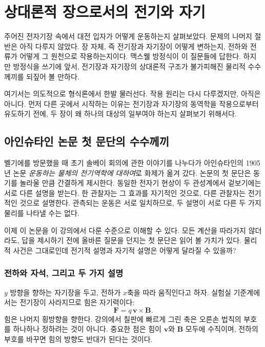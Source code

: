 \chapter{상대론적 장으로서의 전기와 자기}

주어진 전자기장 속에서 대전 입자가 어떻게 운동하는지 살펴보았다. 문제의 나머지 절반은 아직 다루지 않았다. 장 자체, 즉 전기장과 자기장이 어떻게 변하는지, 전하와 전류가 어떻게 그 원천으로 작용하는지이다. 맥스웰 방정식이 이 질문들에 답한다. 하지만 방정식을 쓰기에 앞서, 전기장과 자기장의 상대론적 구조가 불가피해진 물리적 수수께끼를 되짚어 볼 만하다.

여기서는 의도적으로 형식론에서 한발 물러선다. 작용 원리는 다시 다루겠지만, 아직은 아니다. 먼저 다른 곳에서 시작하는 이유는 전기장과 자기장의 동역학을 작용으로부터 유도하기 전에, 두 장이 왜 하나의 대상의 일부여야 하는지 살펴보기 위해서다.

\section{아인슈타인 논문 첫 문단의 수수께끼}

벨기에를 방문했을 때 초기 솔베이 회의에 관한 이야기를 나누다가 아인슈타인의 1905년 논문 \emph{운동하는 물체의 전기역학에 대하여}로 화제가 옮겨 갔다. 논문의 첫 문단은 동기를 놀라울 만큼 간결하게 제시한다. 동일한 전자기 현상이 두 관성계에서 겉보기에는 서로 다른 설명을 받는다. 한 관찰자는 그 효과를 자기적인 것으로, 다른 관찰자는 전기적인 것으로 설명한다. 관측되는 운동은 서로 일치하므로, 두 설명이 서로 다른 두 가지 물리를 나타낼 수는 없다.

이제 이 논문을 이 강의에서 다룬 수준으로 이해할 수 있다. 모든 계산을 따라가지 않더라도, 답을 제시하기 전에 올바른 질문을 던지는 첫 문단은 읽어 볼 가치가 있다. 물리적 사건은 그대로인데 전기적 설명과 자기적 설명은 어떻게 달라질 수 있을까?

\subsection{전하와 자석, 그리고 두 가지 설명}

\(y\) 방향을 향하는 자기장을 두고, 전하가 \(x\)축을 따라 움직인다고 하자. 실험실 기준계에서는 전기장이 사라지므로 힘은 자기력이다:
\begin{equation}
\mathbf F=q\,\mathbf v\times\mathbf B.
\end{equation}
힘은 나머지 횡방향을 향한다. 강의에서 칠판에 빠르게 그린 축은 오른손 법칙의 부호를 하나하나 정하려는 것이 아니다. 중요한 점은 힘이 \(\mathbf v\)와 \(\mathbf B\) 모두에 수직이며, 전하의 부호를 바꾸면 힘의 방향도 반대가 된다는 것이다.

